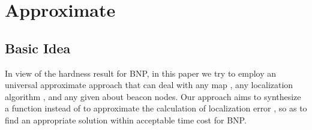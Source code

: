 \documentclass[10pt, conference, letterpaper]{IEEEtran}
\begin{document}
\section{Approximate } \label{approximate}

\subsection{Basic Idea} \label{basic idea}
In view of the hardness result for BNP, in this paper we try to employ an universal approximate approach that can deal with any map , any localization algorithm , and any given  about beacon nodes. Our approach aims to synthesize a function  instead of  to approximate the calculation of localization error , so as to find an appropriate solution within acceptable time cost for BNP.
\end{document}
